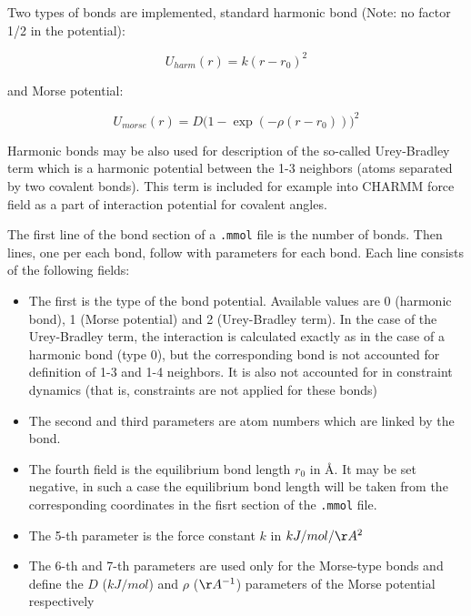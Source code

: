 \documentclass{article}
\begin{document}
Two types of bonds are implemented, standard harmonic bond 
(Note: no factor 1/2 in the potential):

\begin{equation}
\label{harm}
U_{harm}(r) = k(r - r_0)^2
\end{equation}

and Morse potential:

\begin{equation}
\label{morse}
U_{morse}(r) = D\big(1-\exp(-\rho(r-r_0))\big)^2
\end{equation}

Harmonic bonds may be also used for description of the so-called
Urey-Bradley term which is a harmonic potential between the 1-3 neighbors
(atoms separated by two covalent bonds). This term is included for 
example into CHARMM force field as a part of interaction potential for
covalent angles.

The first line of the bond section of a \verb|.mmol| file is the number 
of bonds. Then lines, one per each bond, follow with parameters for each bond.
Each line consists of the following fields:

\begin{itemize}
\item
The first is the type of the bond potential. Available values are 0 
(harmonic bond), 1 (Morse potential) and 2 (Urey-Bradley term). In the case
of the Urey-Bradley term, the interaction is calculated exactly as in the
case of a harmonic bond (type 0), but the corresponding bond is not accounted
for definition of 1-3 and 1-4 neighbors. It is also not accounted for in
constraint dynamics (that is, constraints are not applied for these bonds)

\item
The second and third parameters are atom numbers which are linked by the bond. 

\item
The fourth field is the equilibrium bond length $r_0$ in \AA . It may be
set negative, in such a case the equilibrium bond length will be taken
from the corresponding coordinates in the fisrt section of the 
\verb|.mmol| file.

\item
The 5-th parameter is the force constant $k$
in $kJ/mol/\AA^2$  

\item
The 6-th and 7-th parameters are used only for the Morse-type bonds
and define the $D$ ($kJ/mol$) and $\rho$ ($\AA^{-1}$) parameters 
of the Morse potential respectively
\end{itemize}
\end{document}
